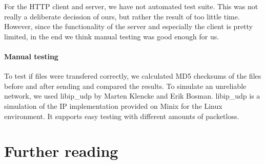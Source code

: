 \documentclass[11pt]{article}
\begin{document}
For the HTTP client and server, we have not automated test suite. This was not
really a deliberate decission of ours, but rather the result of too little
time. However, since the functionality of the server and especially the client
is pretty limited, in the end we think manual testing was good enough for us.

\paragraph{Manual testing}

To test if files were transfered correctly, we calculated MD5 checksums of the
files before and after sending and compared the results. To simulate an
unreliable network, we used libip\_udp by Marten Klencke and Erik
Bosman. libip\_udp is a simulation of the IP implementation provided on Minix
for the Linux environment. It supports easy testing with different amounts of
packetloss.


\section{Further reading}
\end{document}
